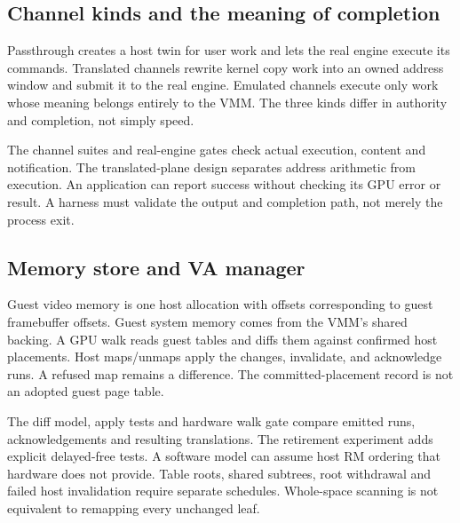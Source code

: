 \subsection{Channel kinds and the meaning of completion}

\doc Passthrough creates a host twin for user work and lets the real engine execute its
commands. Translated channels rewrite kernel copy work into an owned address window and submit
it to the real engine. Emulated channels execute only work whose meaning belongs entirely to
the VMM. The three kinds differ in authority and completion, not simply speed.

{The channel suites and real-engine gates check actual execution, content and notification.
The translated-plane design separates address arithmetic from execution.}
{An application can report success without checking its GPU error or result. A harness must
validate the output and completion path, not merely the process exit.}

\subsection{Memory store and VA manager}

\doc Guest video memory is one host allocation with offsets corresponding to guest
framebuffer offsets. Guest system memory comes from the VMM's shared backing. A GPU walk
reads guest tables and diffs them against confirmed host placements. Host maps/unmaps apply
the changes, invalidate, and acknowledge runs. A refused map remains a difference.
The committed-placement record is not an adopted guest page table.

{The diff model, apply tests and hardware walk gate compare emitted runs, acknowledgements
and resulting translations. The retirement experiment adds explicit delayed-free tests.
}
{A software model can assume host RM ordering that hardware does not provide. Table roots,
shared subtrees, root withdrawal and failed host invalidation require separate schedules.
Whole-space scanning is not equivalent to remapping every unchanged leaf.}

